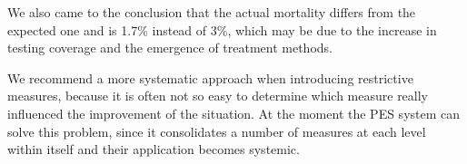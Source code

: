 \documentclass[12pt,a4paper,english]{article}
\begin{document}
    We also came to the conclusion that the actual mortality differs from the expected one and is 1.7\% instead of 3\%,
    which may be due to the increase in testing coverage and the emergence of treatment methods.

    We recommend a more systematic approach when introducing restrictive measures, 
    because it is often not so easy to determine which measure really influenced the improvement of the situation. 
    At the moment the PES system can solve this problem, since it consolidates a number of measures at each level within itself and their application becomes systemic.  

    \clearpage
    \nocite{*}
	
	
\end{document}
